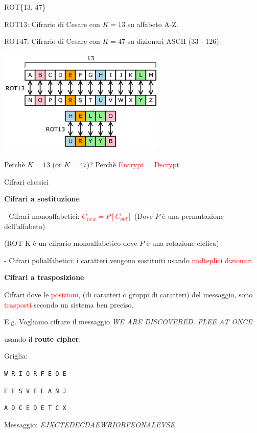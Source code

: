 \documentclass[handout, xcolor=dvipsnames,aspectratio=169]{beamer}
\begin{document}
\begin{frame}{ROT\{13, 47\}}

\centering

\medskip

ROT13: Cifrario di Cesare con $K = 13$ su alfabeto A-Z.

ROT47: Cifrario di Cesare con $K = 47$ su dizionari ASCII (33 - 126).

\medskip

\includegraphics[width=8cm]{img/ROT13.png}

\medskip

Perchè $K = 13$ (or $K = 47$)? 
Perchè \textcolor{red}{Encrypt = Decrypt}

\end{frame}

\begin{frame}{Cifrari classici}

\textbf{Cifrari a sostituzione}

\phantom{pad}- Cifrari monoalfabetici: \textcolor{red}{$C_{new} = P[C_{old}]$} (Dove $P$ è una permutazione dell'alfabeto)

\smallskip

\phantom{pad}(ROT-K è un cifrario monoalfabetico dove $P$ è una rotazione ciclica)

\smallskip

\phantom{pad}- Cifrari polialfabetici: i caratteri vengono sostituiti usando \textcolor{red}{molteplici dizionari}  

\smallskip

\textbf{Cifrari a trasposizione}

\phantom{pad}Cifrari dove le \textcolor{red}{posizioni}, \phantom{pad}(di caratteri o gruppi di caratteri) del messaggio, sono \textcolor{red}{trasposti} secondo un sistema ben preciso.

\smallskip

E.g. Vogliamo cifrare il messaggio \textit{WE ARE DISCOVERED. FLEE AT ONCE}

usando il \textbf{route cipher}:

Griglia: 

\centerline{\texttt{W R I O R F E O E}}
\centerline{\texttt{E E S V E L A N J}}
\centerline{\texttt{A D C E D E T C X}}

Messaggio: \textit{EJXCTEDECDAEWRIORFEONALEVSE}

\end{frame}
\end{document}
